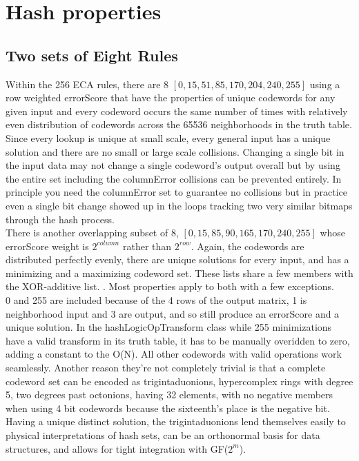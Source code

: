 \documentclass[11pt]{article}
\begin{document}
\section{Hash properties}



\subsection{Two sets of Eight Rules}
Within the 256 ECA rules, there are 8 $[0,15,51,85,170,204,240,255]$ using a row weighted errorScore that have the properties of unique codewords for any given input and every codeword occurs the same number of times with relatively even distribution of codewords across the 65536 neighborhoods in the truth table.  Since every lookup is unique at small scale, every general input has a unique solution and there are no small or large scale collisions. Changing a single bit in the input data may not change a single codeword's output overall but by using the entire set including the columnError collisions can be prevented entirely. In principle you need the columnError set to guarantee no collisions but in practice even a single bit change showed up in the loops tracking two very similar bitmaps through the hash process.\\

There is another overlapping subset of 8, $[0,15,85,90,165,170,240,255]$ whose errorScore weight is $2^{column}$ rather than $2^{row}$. Again, the codewords are distributed perfectly evenly, there are unique solutions for every input, and has a minimizing and a maximizing codeword set. These lists share a few members with the XOR-additive list. \cite{xorAdditive}. Most properties apply to both with a few exceptions.\\

0 and 255 are included because of the 4 rows of the output matrix, 1 is neighborhood input and 3 are output, and so still produce an errorScore and a unique solution. In the hashLogicOpTransform class while 255 minimizations have a valid transform in its truth table, it has to be manually overidden to zero, adding a constant to the O(N). All other codewords with valid operations work seamlessly. Another reason they're not completely trivial is that a complete codeword set can be encoded as trigintaduonions, hypercomplex rings with degree 5, two degrees past octonions, having 32 elements, with no negative members when using 4 bit codewords because the sixteenth's place is the negative bit. Having a unique distinct solution, the trigintaduonions lend themselves easily to physical interpretations of hash sets, can be an orthonormal basis for data structures, and allows for tight integration with GF($2^m$).  \\
\end{document}
